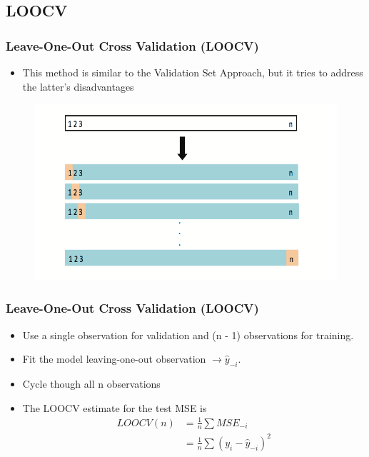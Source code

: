 \documentclass[
  shownotes,
  xcolor={svgnames},
  hyperref={colorlinks,citecolor=DarkBlue,linkcolor=DarkRed,urlcolor=DarkBlue}
  , aspectratio=169]{beamer}
\begin{document}
\subsection{LOOCV}
\begin{frame}[fragile]
\frametitle{Leave-One-Out Cross Validation (LOOCV)}

\begin{itemize}
\item This method is similar to the Validation Set Approach, but it tries to address the latter’s disadvantages 
\end{itemize}

 \begin{figure}[H] \centering
            \captionsetup{justification=centering}
              \includegraphics[scale=0.7]{figures/fig53.png}
       \end{figure}


\end{frame}
\begin{frame}[fragile]
\frametitle{Leave-One-Out Cross Validation (LOOCV)}


\begin{itemize}
\item Use a single observation for validation and (n - 1) observations for training.
\medskip
\item Fit the model leaving-one-out observation $\rightarrow \hat{y}_{-i}$.
\medskip
\item Cycle though all n observations
\medskip
\item The LOOCV estimate for the test MSE is
\begin{align}
LOOCV(n) &= \frac{1}{n}\sum MSE_{-i} \\ 
      &= \frac{1}{n}\sum(y_i -\hat{y}_{-i})^2
\end{align}
\end{itemize}

\end{frame}
\end{document}

